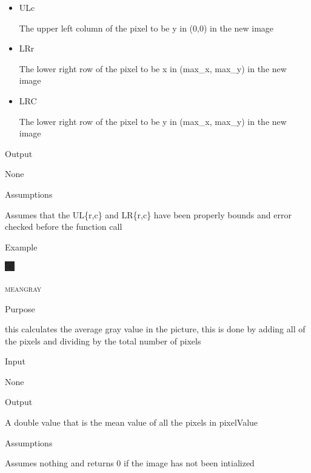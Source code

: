 \documentclass[pdftex, 11pt]{article}
\begin{document}
\begin{description}
\begin{description}
\begin{itemize}
					\item{ULc}

						The upper left column of the pixel
						to be y in (0,0) in the new image

					\item{LRr}

						The lower right row of the pixel
						to be x in (max\_x, max\_y) in the
						new image

					\item{LRC}

						The lower right row of the pixel
						to be y in (max\_x, max\_y) in the
						new image

				\end{itemize}


			\item{Output}

				None


			\item{Assumptions}

				Assumes that the UL\{r,c\} and LR\{r,c\} have been
				properly bounds and error checked before the function
				call

			\item{Example}

				\includegraphics{images/outsubimg.png}

		\end{description}


	\item{\textsc{meangray}}
		\begin{description}
			\item{Purpose}

				
				this calculates the average gray value in the
				picture, this is done by adding
				all of the pixels and dividing by the total
				number of pixels

			\item{Input}

				None

			\item{Output}

				A double value that is the mean value of all
				the pixels in pixelValue


			\item{Assumptions}

				Assumes nothing and returns 0 if the image 
				has not been intialized


\end{description}
\end{description}
\end{document}

